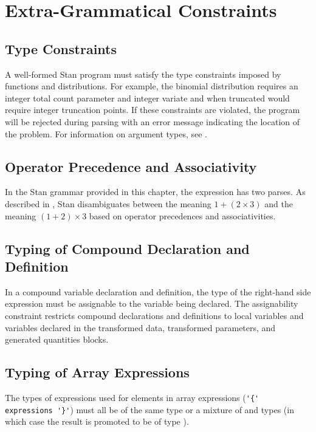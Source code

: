 \section{Extra-Grammatical Constraints}

\subsection{Type Constraints}

A well-formed Stan program must satisfy the type constraints imposed
by functions and distributions.  For example, the binomial
distribution requires an integer total count parameter and integer
variate and when truncated would require integer truncation points.
If these constraints are violated, the program will be rejected during
parsing with an error message indicating the location of the problem.
For information on argument types, see .

\subsection{Operator Precedence and Associativity}

In the Stan grammar provided in this chapter, the expression  has two parses.  As described in
, Stan disambiguates between the
meaning $1 + (2 \times 3)$ and the meaning $(1 + 2) \times 3$ based on
operator precedences and associativities.

\subsection{Typing of Compound Declaration and Definition}

In a compound variable declaration and definition, the type of the
right-hand side expression must be assignable to the variable being
declared.  The assignability constraint restricts compound
declarations and definitions to local variables and variables declared
in the transformed data, transformed parameters, and generated
quantities blocks.

\subsection{Typing of Array Expressions}

The types of expressions used for elements in array expressions
(\Verb|'{' expressions '}'|) must all be of the same type or a mixture
of  and  types (in which case the result is
promoted to be of type ).

